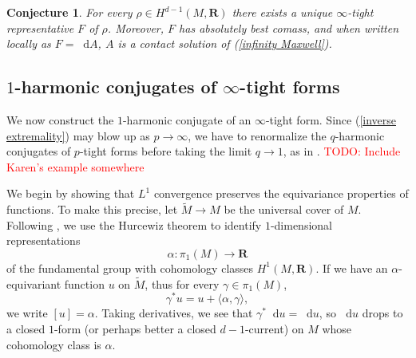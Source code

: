 \documentclass[reqno,11pt]{amsart}
\newcommand{\RR}{\mathbf{R}}
\newcommand*\dif{\mathop{}\!\mathrm{d}}
\newtheorem{conjecture}[theorem]{Conjecture}
\theoremstyle{definition}
\numberwithin{equation}{section}
\newcommand\todo[1]{\textcolor{red}{TODO: #1}}
\begin{document}
\begin{conjecture}
For every $\rho \in H^{d - 1}(M, \RR)$ there exists a unique $\infty$-tight representative $F$ of $\rho$.
Moreover, $F$ has absolutely best comass, and when written locally as $F = \dif A$, $A$ is a contact solution of (\ref{infinity Maxwell}).
\end{conjecture}


\subsection{\texorpdfstring{$1$-harmonic conjugates of $\infty$-tight forms}{One-harmonic conjugates of infinity-tight forms}}
We now construct the $1$-harmonic conjugate of an $\infty$-tight form.
Since (\ref{inverse extremality}) may blow up as $p \to \infty$, we have to renormalize the $q$-harmonic conjugates of $p$-tight forms before taking the limit $q \to 1$, as in \cite[\S3.2]{daskalopoulos2020transverse}. \todo{Include Karen's example somewhere}

We begin by showing that $L^1$ convergence preserves the equivariance properties of functions.
To make this precise, let $\tilde M \to M$ be the universal cover of $M$.
Following \cite[\S4]{daskalopoulos2020transverse}, we use the Hurcewiz theorem to identify $1$-dimensional representations
$$\alpha: \pi_1(M) \to \RR$$
of the fundamental group with cohomology classes $H^1(M, \RR)$.
If we have an $\alpha$-equivariant function $u$ on $\tilde M$, thus for every $\gamma \in \pi_1(M)$,
$$\gamma^* u = u + \langle \alpha, \gamma\rangle,$$
we write $[u] = \alpha$.
Taking derivatives, we see that $\gamma^* \dif u = \dif u$, so $\dif u$ drops to a closed $1$-form (or perhaps better a closed $d-1$-current) on $M$ whose cohomology class is $\alpha$.
\end{document}
